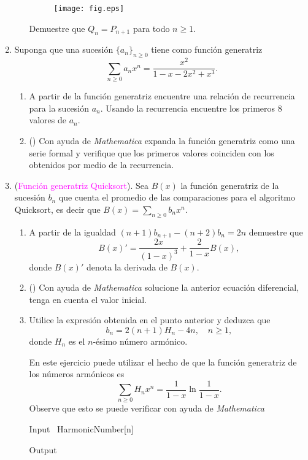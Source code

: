 \documentclass[12pt, oneside]{article}%
\def\Wolfram{{\emph{Mathematica}\textsuperscript{\textregistered} }}
\begin{document}
\begin{enumerate}
\begin{enumerate}
    \begin{figure}[H]
    \centering
\texttt{[image: fig.eps]}
    \end{figure}
     Demuestre que $Q_n=P_{n+1}$ para todo $n\geq 1$.

	\end{enumerate}



	
	\item Suponga que una sucesión $\{ a_n\}_{n\geq 0}$ tiene como función generatriz
$$\sum_{n\geq 0} a_n x^n = \frac{x^2}{1-x-2x^2+x^3}.$$
   	\begin{enumerate}
\item A partir de la función generatriz encuentre una relación de recurrencia para la sucesión $a_n$. Usando la recurrencia encuentre los primeros  8 valores de $a_n$.
\item(\manimpossiblecube)  Con ayuda de  \Wolfram expanda la función generatriz como una serie formal y verifique que los primeros valores coinciden con los obtenidos por medio de la recurrencia. 
\end{enumerate}





\item\label{rec2} (\textcolor{magenta}{Función generatriz Quicksort}). Sea $B(x)$ la función generatriz de la sucesión $b_n$ que cuenta el promedio de las comparaciones para el algoritmo Quicksort, es decir que $B(x)=\sum_{n\geq 0} b_nx^n$.
\begin{enumerate}

\item A partir de la igualdad
$(n+1)b_{n+1}-(n+2)b_n=2n$ demuestre que 
$$B(x)'=\frac{2x}{(1-x)^3}+\frac{2}{1-x}B(x),$$
donde $B(x)'$ denota la derivada de $B(x)$.
\item(\manimpossiblecube) Con ayuda de  \Wolfram solucione la anterior ecuación diferencial, tenga en cuenta el valor inicial.
\item Utilice la expresión obtenida en el punto anterior y deduzca que $$b_n=2(n+1)H_n-4n, \quad n\geq 1,$$
donde $H_n$ es el $n$-ésimo número armónico.

En este ejercicio puede utilizar el hecho de que la función generatriz de los números armónicos es
$$\sum_{n\geq 0}H_n x^n =\frac{1}{1-x} \ln \frac{1}{1-x}.$$
Observe que esto se puede verificar con ayuda de \Wolfram 
\begin{mmaCell}[morefunctionlocal={n}]{Input}
  \
HarmonicNumber[n] 
\end{mmaCell}
\begin{mmaCell}{Output}
\end{mmaCell}


\end{enumerate}
\end{enumerate}
\end{document}
